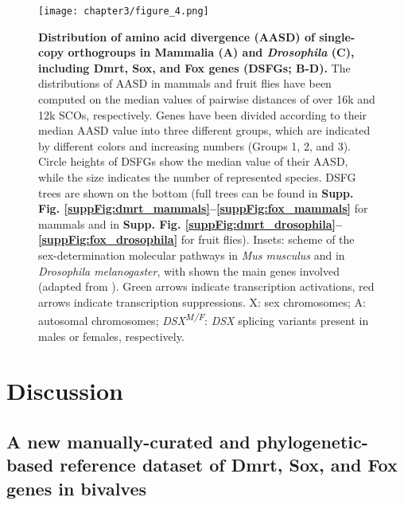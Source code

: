 \documentclass[../main.tex]{subfiles}
\begin{document}
\begin{figure}
	\centering
	\texttt{[image: chapter3/figure\_4.png]}
	\captionsetup{width=\textwidth}
	\caption{
		\textbf{Distribution of amino acid divergence (AASD) of single-copy orthogroups in Mammalia (A) and \textit{Drosophila} (C), including Dmrt, Sox, and Fox genes (DSFGs; B-D).} The distributions of AASD in mammals and fruit flies have been computed on the median values of pairwise distances of over 16k and 12k SCOs, respectively. Genes have been divided according to their median AASD value into three different groups, which are indicated by different colors and increasing numbers (Groups 1, 2, and 3). Circle heights of DSFGs show the median value of their AASD, while the size indicates the number of represented species. DSFG trees are shown on the bottom (full trees can be found in \textbf{Supp. Fig. \ref{suppFig:dmrt_mammals}--\ref{suppFig:fox_mammals}} for mammals and in \textbf{Supp. Fig. \ref{suppFig:dmrt_drosophila}--\ref{suppFig:fox_drosophila}} for fruit flies). Insets: scheme of the sex-determination molecular pathways in \textit{Mus musculus} and in \textit{Drosophila melanogaster}, with shown the main genes involved (adapted from \textbf{\cite{beukeboom2014evolution}}). Green arrows indicate transcription activations, red arrows indicate transcription suppressions. X: sex chromosomes; A: autosomal chromosomes; \textit{DSX\textsuperscript{M/F}}: \textit{DSX} splicing variants present in males or females, respectively.
	}
	\label{fig:DSFG_testDivergence}
\end{figure}

\section{Discussion} \label{chpater3_discussion}
\subsection{A new manually-curated and phylogenetic-based reference dataset of Dmrt, Sox, and Fox genes in bivalves}
\end{document}
